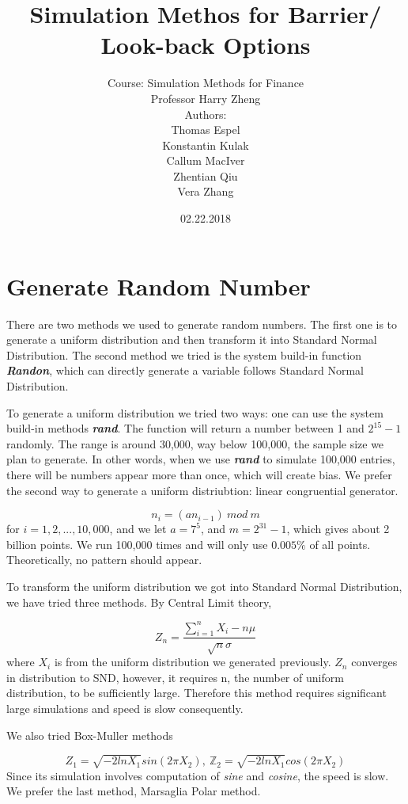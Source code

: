 \documentclass[12pt,a4paper,fleqn]{article}
\author{Course: Simulation Methods for Finance\\Professor Harry Zheng
\\[3cm] Authors:\\
Thomas Espel\\ Konstantin Kulak\\ Callum MacIver\\Zhentian Qiu\\Vera Zhang }
\title{Simulation Methos for Barrier/ Look-back Options }
\date{02.22.2018}
\newcommand\Z{\mathbb Z}
\begin{document}
\maketitle

\newpage

\newpage

\section{Generate Random Number}

There are two methods we used to generate random numbers.
The first one is to generate a uniform distribution and then transform it into Standard Normal Distribution. The second method we tried is the system build-in function\textbf{\textit{ Randon}}, which can directly generate a variable follows Standard Normal Distribution.

To generate a uniform distribution we tried two ways: one can use the system build-in methods \textbf{\textit{rand}}. The function will return a number between 1 and $2^{15} -1$ randomly. The range is around 30,000, way below 100,000, the sample size we plan to generate. In other words, when we use \textbf{\textit{rand}} to simulate 100,000 entries, there will be numbers appear more than once, which will create bias. We prefer the second way to generate a uniform distriubtion: linear congruential generator.

$$n_i = (an_{i-1}) \ mod\ m$$for $i=1,2,...,10,000$, and we let $ a = 7^5$, and $m = 2^{31}-1$, which gives about 2 billion points. We run 100,000 times and will only use $0.005\%$ of all points. Theoretically, no pattern should appear.

To transform the uniform distribution we got into Standard Normal Distribution, we have tried three methods. By Central Limit theory,

$$ Z_n = \frac{\sum_{i=1}^{n}X_i-n\mu}{\sqrt{n}\sigma}$$where $X_i$ is from the uniform distribution we generated previously. $Z_n$ converges in distribution to SND, however, it requires n, the number of uniform distribution, to be sufficiently large. Therefore this method requires significant large simulations and speed is slow consequently.

We also tried Box-Muller methods

$$Z_1 = \sqrt{-2lnX_1}sin(2\pi X_2),\  \Z_2=\sqrt{-2lnX_1}cos(2\pi X_2)$$Since its simulation involves computation of \textit{sine} and \textit{cosine}, the speed is slow.
We prefer the last method, Marsaglia Polar method.
\end{document}
